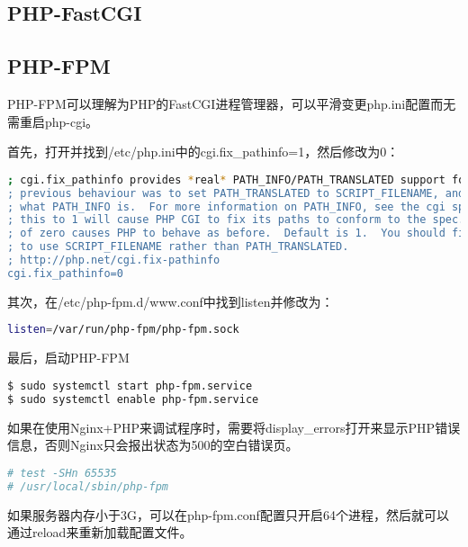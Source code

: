 \subsection{PHP-FastCGI}


\subsection{PHP-FPM}


PHP-FPM可以理解为PHP的FastCGI进程管理器，可以平滑变更php.ini配置而无需重启php-cgi。


首先，打开并找到/etc/php.ini中的cgi.fix\_pathinfo=1，然后修改为0：


\begin{lstlisting}[language=bash]
; cgi.fix_pathinfo provides *real* PATH_INFO/PATH_TRANSLATED support for CGI.  PHP's
; previous behaviour was to set PATH_TRANSLATED to SCRIPT_FILENAME, and to not grok
; what PATH_INFO is.  For more information on PATH_INFO, see the cgi specs.  Setting
; this to 1 will cause PHP CGI to fix its paths to conform to the spec.  A setting
; of zero causes PHP to behave as before.  Default is 1.  You should fix your scripts
; to use SCRIPT_FILENAME rather than PATH_TRANSLATED.
; http://php.net/cgi.fix-pathinfo
cgi.fix_pathinfo=0
\end{lstlisting}


其次，在/etc/php-fpm.d/www.conf中找到listen并修改为：



\begin{lstlisting}[language=bash]
listen=/var/run/php-fpm/php-fpm.sock
\end{lstlisting}


最后，启动PHP-FPM



\begin{lstlisting}[language=bash]
$ sudo systemctl start php-fpm.service
$ sudo systemctl enable php-fpm.service
\end{lstlisting}



如果在使用Nginx+PHP来调试程序时，需要将display\_errors打开来显示PHP错误信息，否则Nginx只会报出状态为500的空白错误页。

\begin{lstlisting}[language=bash]
# test -SHn 65535
# /usr/local/sbin/php-fpm
\end{lstlisting}

如果服务器内存小于3G，可以在php-fpm.conf配置只开启64个进程，然后就可以通过reload来重新加载配置文件。

